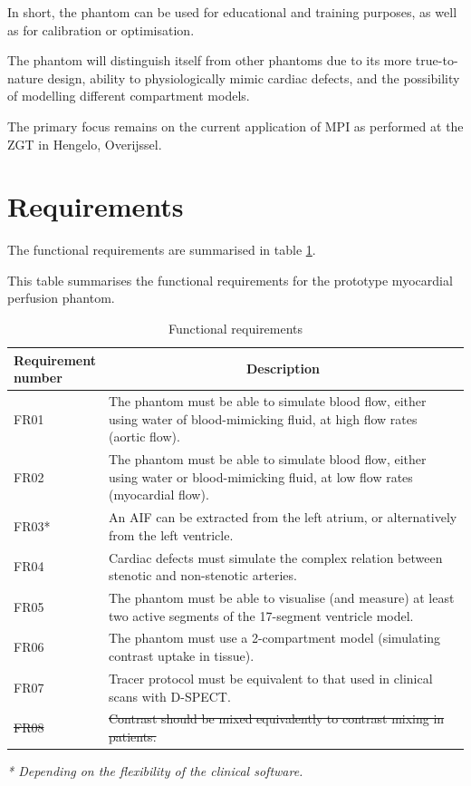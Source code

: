 In short, the phantom can be used for educational and training purposes, as well as for calibration or optimisation. 

The phantom will distinguish itself from other phantoms due to its more true-to-nature design, ability to physiologically mimic cardiac defects, and the possibility of modelling different compartment models.

The primary focus remains on the current application of \ac{MPI} as performed at the ZGT in Hengelo, Overijssel.

\section{Requirements}
The functional requirements are summarised in table \ref{tab:funcreq}.

\begin{table}[h]
\caption{Functional requirements}
\label{tab:funcreq}
This table summarises the functional requirements for the prototype myocardial perfusion phantom.
\begin{tabular}{l|p{120mm}|}
	\makecell[l]{Requirement \\ number} & \multicolumn{1}{c}{Description}\\
	\hline
	FR01 & The phantom must be able to simulate blood flow, either using water of blood-mimicking fluid, at high flow rates (aortic flow). \\ 
	\rowcolor{Gray}
	FR02 & The phantom must be able to simulate blood flow, either using water or blood-mimicking fluid, at low flow rates (myocardial flow). \\
	FR03* & An \ac{AIF} can be extracted from the left atrium, or alternatively from the left ventricle. \\
	\rowcolor{Gray}
	FR04 & Cardiac defects must simulate the complex relation between stenotic and non-stenotic arteries. \\
	FR05 & The phantom must be able to visualise (and measure) at least two active segments of the 17-segment ventricle model. \\
	\rowcolor{Gray}
	FR06 & The phantom must use a 2-compartment model (simulating contrast uptake in tissue). \\
	FR07 & Tracer protocol must be equivalent to that used in clinical scans with D-SPECT. \\
	\rowcolor{Gray}
	\sout{FR08} & \sout{Contrast should be mixed equivalently to contrast mixing in patients.} \\
	\cline{2-2}
\end{tabular}
\raggedright
\textit{* Depending on the flexibility of the clinical software.}
\end{table}

